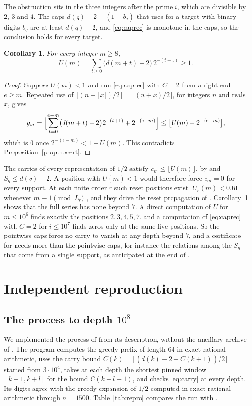 \documentclass[11pt]{amsart}
\newtheorem{corollary}[theorem]{Corollary}
\begin{document}
The obstruction sits in the three integers after the prime $i$, which are
divisible by $2$, $3$ and $4$. The caps $d(q)-2+(1-b_q)$ that \cite[\S7]{hong} uses for a target with
binary digits $b_q$ are at least $d(q)-2$, and \eqref{eq:caprec} is monotone in
the caps, so the conclusion holds for every target.

\begin{corollary}\label{cor:noreset}
For every integer $m\ge8$,
\[
 U(m)=\sum_{t\ge0}\bigl(d(m+t)-2\bigr)\,2^{-(t+1)}\ge1.
\]
\end{corollary}

\begin{proof}
Suppose $U(m)<1$ and run \eqref{eq:caprec} with $C=2$ from a right end
$e\ge m$. Repeated use of $\lfloor(n+\lfloor x\rfloor)/2\rfloor=\lfloor(n+x)/2\rfloor$,
for integers $n$ and reals $x$, gives
\[
 g_m=\Bigl\lfloor\sum_{t=0}^{e-m}\bigl(d(m+t)-2\bigr)2^{-(t+1)}+2^{-(e-m)}\Bigr\rfloor
 \le\bigl\lfloor U(m)+2^{-(e-m)}\bigr\rfloor,
\]
which is $0$ once $2^{-(e-m)}<1-U(m)$. This contradicts
Proposition~\ref{prop:nocert}.
\end{proof}

The carries of every representation of $1/2$ satisfy $c_m\le\lfloor U(m)\rfloor$,
by \cite[Lemma~3.1]{hong} and $S_q\le d(q)-2$. A position with $U(m)<1$ would
therefore force $c_m=0$ for every support. At each finite order $r$ such reset
positions exist: $U_r(m)<0.61$ whenever $m\equiv1\pmod{L_r}$
\cite[Lemma~4.1]{hong}, and they drive the reset propagation of
\cite[Theorem~4.6]{hong}. Corollary~\ref{cor:noreset} shows that the full
series has none beyond $7$. A direct computation of $U$ for $m\le10^6$ finds
exactly the positions $2,3,4,5,7$, and a computation of \eqref{eq:caprec} with
$C=2$ for $i\le10^7$ finds zeros only at the same five positions. So the
pointwise caps force no carry to vanish at any depth beyond $7$, and a
certificate for \cite[Conjecture~6.3]{hong} needs more than the pointwise caps,
for instance the relations among the $S_q$ that come from a single support, as
anticipated at the end of \cite[\S9.4]{hong}.

\section{Independent reproduction}

\subsection*{The process to depth $10^8$}
We implemented the process of \cite[\S6]{hong} from its description, without
the ancillary archive of \cite{hong}. The program computes the greedy prefix of
length $64$ in exact rational arithmetic, uses the carry bound
$\overline C(k)=\lfloor(d(k)-2+\overline C(k+1))/2\rfloor$ started from
$3\cdot10^4$, takes at each depth the shortest pinned window $[k+1,k+l]$ for the
bound $\overline C(k+l+1)$, and checks \eqref{eq:carry} at every depth. Its
digits agree with the greedy expansion of $1/2$ computed in exact rational
arithmetic through $n=1500$. Table~\ref{tab:repro} compares the run with
\cite[\S6.1 and Table~3]{hong}.
\end{document}
